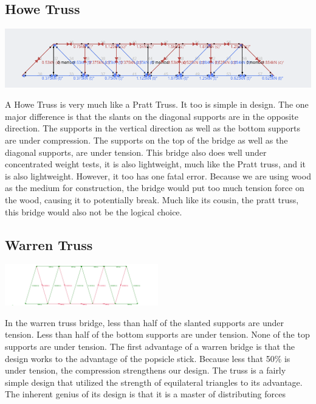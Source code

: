 \documentclass[paper=a4, fontsize=11pt]{scrartcl}
\numberwithin{equation}{section}		%
\numberwithin{figure}{section}			%
\numberwithin{table}{section}				%
\begin{document}
\subsection{Howe Truss}

\begin{center}
    \includegraphics[scale=0.5]{HoweTruss}
\end{center}
A Howe Truss is very much like a Pratt Truss. It too is simple in design. The one major difference is that the slants on the diagonal supports are in the opposite direction. The supports in the vertical direction as well as the bottom supports are under compression. The supports on the top of the bridge as well as the diagonal supports, are under tension. This bridge also does well under concentrated weight tests, it is also lightweight, much like the Pratt truss, and it is also lightweight. However, it too has one fatal error. Because we are using wood as the medium for construction, the bridge would put too much tension force on the wood, causing it to potentially break. Much like its cousin, the pratt truss, this bridge would also not be the logical choice.

\subsection{Warren Truss}
\begin{center}
    \includegraphics[width=0.5\textwidth]{WarrenTruss}
\end{center}
In the warren truss bridge, less than half of the slanted supports are under tension. Less than half of the bottom supports are under tension. None of the top supports are under tension. The first advantage of a warren bridge is that the design works to the advantage of the popsicle stick. Because less that 50\% is under tension, the compression strengthens our design. The truss is a fairly simple design that utilized the strength of equilateral triangles to its advantage. The inherent genius of its design is that it is a master of distributing forces
\end{document}
